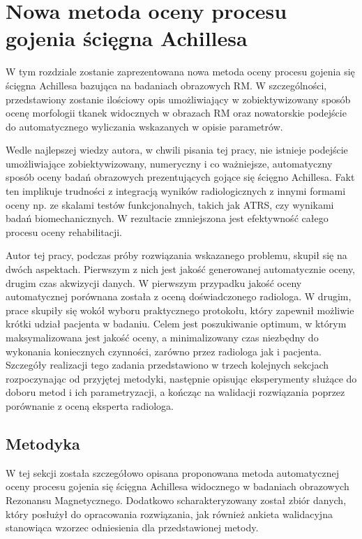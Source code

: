 \chapter{Nowa metoda oceny procesu gojenia ścięgna Achillesa}
\label{NewMethod}

W tym rozdziale zostanie zaprezentowana nowa metoda oceny procesu gojenia się ścięgna Achillesa bazująca na badaniach obrazowych RM. W szczególności, przedstawiony zostanie ilościowy opis umożliwiający w zobiektywizowany sposób ocenę morfologii tkanek widocznych w obrazach RM oraz nowatorskie podejście do automatycznego wyliczania wskazanych w opisie parametrów. 

Wedle najlepszej wiedzy autora, w chwili pisania tej pracy, nie istnieje podejście umożliwiające zobiektywizowany, numeryczny i co ważniejsze, automatyczny sposób oceny badań obrazowych prezentujących gojące się ścięgno Achillesa. Fakt ten implikuje trudności z integracją wyników radiologicznych z innymi formami oceny np. ze skalami testów funkcjonalnych, takich jak ATRS, czy wynikami badań biomechanicznych. W rezultacie zmniejszona jest efektywność całego procesu oceny rehabilitacji. 

Autor tej pracy, podczas próby rozwiązania wskazanego problemu, skupił się \linebreak na dwóch aspektach. Pierwszym z nich jest jakość generowanej automatycznie oceny, drugim czas akwizycji danych. W pierwszym przypadku jakość oceny automatycznej porównana została z oceną doświadczonego radiologa. W drugim, prace skupiły się wokół wyboru praktycznego protokołu, który zapewnił możliwie krótki udział pacjenta w badaniu. Celem jest poszukiwanie optimum, w którym maksymalizowana jest jakość oceny, a minimalizowany czas niezbędny do wykonania koniecznych czynności, zarówno przez radiologa jak i pacjenta. Szczegóły realizacji tego zadania przedstawiono w trzech kolejnych sekcjach rozpoczynając od przyjętej metodyki, następnie opisując eksperymenty służące do doboru metod i ich parametryzacji, \linebreak a kończąc na walidacji rozwiązania poprzez porównanie z oceną eksperta radiologa.

\section{Metodyka}
\label{seq:method}
W tej sekcji została szczegółowo opisana proponowana metoda automatycznej oceny procesu gojenia się ścięgna Achillesa widocznego w badaniach obrazowych Rezonansu Magnetycznego. Dodatkowo scharakteryzowany został zbiór danych, który posłużył do opracowania rozwiązania, jak również ankieta walidacyjna stanowiąca wzorzec odniesienia dla przedstawionej metody. 

